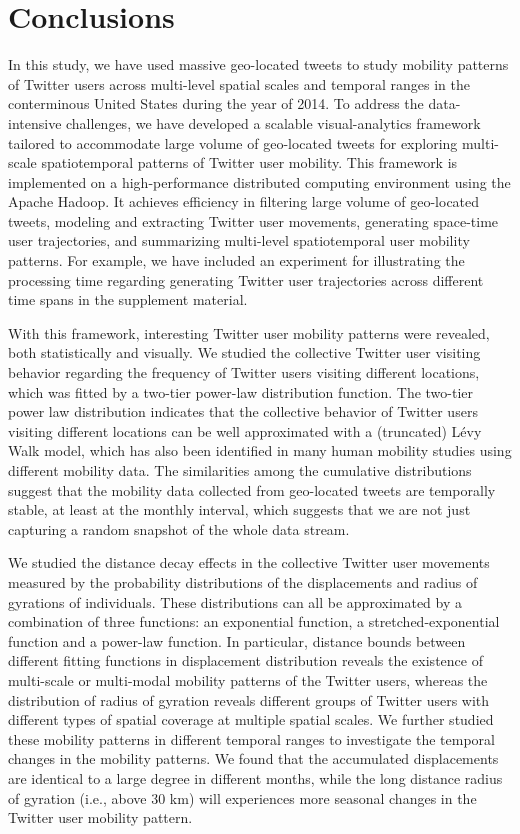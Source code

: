 \documentclass[ijgi,article,accept,moreauthors,pdftex,10pt,a4paper]{mdpi}
\theoremstyle{mdpi}
\newcounter{ex}
\newcounter{re}
\theoremstyle{mdpidefinition}
\begin{document}
\section{Conclusions}
In this study, we have used massive geo-located tweets to study mobility patterns of Twitter users across multi-level spatial scales and temporal ranges in the conterminous United States during the year of 2014. 
To address the data-intensive challenges, we have developed a scalable visual-analytics framework tailored to accommodate large volume of geo-located tweets for exploring multi-scale spatiotemporal patterns of Twitter user mobility.
This framework is implemented on a high-performance distributed computing environment using the Apache Hadoop.
It achieves efficiency in filtering large volume of geo-located tweets, modeling and extracting Twitter user movements, generating space-time user trajectories, and summarizing multi-level spatiotemporal user mobility patterns. For example, we have included an experiment for illustrating the processing time regarding generating Twitter user trajectories across different time spans in the supplement material.

With this framework, interesting Twitter user mobility patterns were revealed, both statistically and visually.
We studied the collective Twitter user visiting behavior regarding the frequency of Twitter users visiting different locations, which was fitted by a two-tier power-law distribution function.
The two-tier power law distribution indicates that the collective behavior of Twitter users visiting different locations can be well approximated with a (truncated) L\'{e}vy Walk model, which has also been identified in many human mobility studies using different mobility data.
The similarities among the cumulative distributions suggest that the mobility data collected from geo-located tweets are temporally stable, at least at the monthly interval, which suggests that we are not just capturing a random snapshot of the whole data stream. 

We studied the distance decay effects in the collective Twitter user movements measured by the probability distributions of the displacements and radius of gyrations of individuals. 
These distributions can all be approximated by a combination of three functions: an exponential function, a stretched-exponential function and a power-law function. In particular, distance bounds between different fitting functions in displacement distribution reveals the existence of multi-scale or multi-modal mobility patterns of the Twitter users, whereas the distribution of radius of gyration reveals different groups of Twitter users with different types of spatial coverage at multiple spatial scales.   
We further studied these mobility patterns in different temporal ranges to investigate the temporal changes in the mobility patterns. 
We found that the accumulated displacements are identical to a large degree in different months, while the long distance radius of gyration (i.e., above 30 km) will experiences more seasonal changes in the Twitter user mobility pattern.
\end{document}
